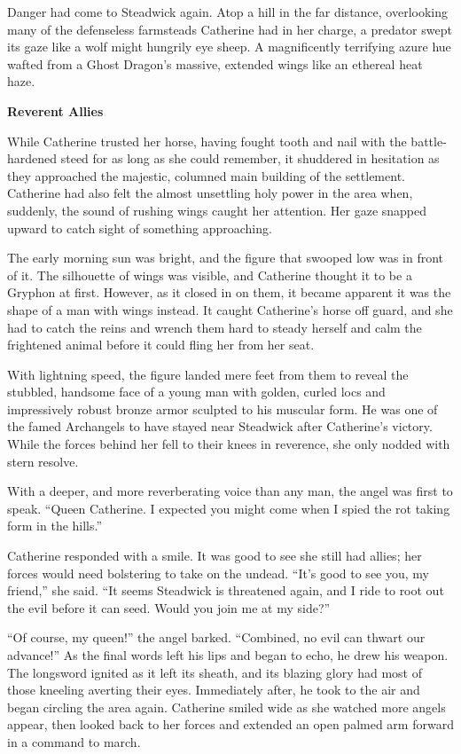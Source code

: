 \begin{multicols*}{2}
Danger had come to Steadwick again.
Atop a hill in the far distance, overlooking many of the defenseless farmsteads Catherine had in her charge, a predator swept its gaze like a wolf might hungrily eye sheep.
A magnificently terrifying azure hue wafted from a Ghost Dragon's massive, extended wings like an ethereal heat haze.

\textbf{Reverent Allies}

While Catherine trusted her horse, having fought tooth and nail with the battle-hardened steed for as long as she could remember, it shuddered in hesitation as they approached the majestic, columned main building of the settlement.
Catherine had also felt the almost unsettling holy power in the area when, suddenly, the sound of rushing wings caught her attention.
Her gaze snapped upward to catch sight of something approaching. 

The early morning sun was bright, and the figure that swooped low was in front of it.
The silhouette of wings was visible, and Catherine thought it to be a Gryphon at first.
However, as it closed in on them, it became apparent it was the shape of a man with wings instead.
It caught Catherine's horse off guard, and she had to catch the reins and wrench them hard to steady herself and calm the frightened animal before it could fling her from her seat.

With lightning speed, the figure landed mere feet from them to reveal the stubbled, handsome face of a young man with golden, curled locs and impressively robust bronze armor sculpted to his muscular form.
He was one of the famed Archangels to have stayed near Steadwick after Catherine's victory.
While the forces behind her fell to their knees in reverence, she only nodded with stern resolve.

With a deeper, and more reverberating voice than any man, the angel was first to speak.
``Queen Catherine.
I expected you might come when I spied the rot taking form in the hills.''

Catherine responded with a smile.
It was good to see she still had allies; her forces would need bolstering to take on the undead.
``It's good to see you, my friend,'' she said.
``It seems Steadwick is threatened again, and I ride to root out the evil before it can seed.
Would you join me at my side?''

``Of course, my queen!'' the angel barked.
``Combined, no evil can thwart our advance!'' As the final words left his lips and began to echo, he drew his weapon.
The longsword ignited as it left its sheath, and its blazing glory had most of those kneeling averting their eyes.
Immediately after, he took to the air and began circling the area again.
Catherine smiled wide as she watched more angels appear, then looked back to her forces and extended an open palmed arm forward in a command to march.


\end{multicols*}
